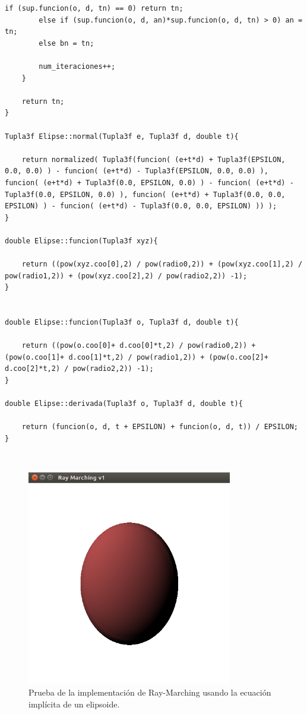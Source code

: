 \begin{lstlisting}[style=Consola]
		if (sup.funcion(o, d, tn) == 0) return tn;
		else if (sup.funcion(o, d, an)*sup.funcion(o, d, tn) > 0) an = tn;
		else bn = tn;
		
		num_iteraciones++;
	}

	return tn;
}

Tupla3f Elipse::normal(Tupla3f e, Tupla3f d, double t){

	return normalized( Tupla3f(funcion( (e+t*d) + Tupla3f(EPSILON, 0.0, 0.0) ) - funcion( (e+t*d) - Tupla3f(EPSILON, 0.0, 0.0) ), funcion( (e+t*d) + Tupla3f(0.0, EPSILON, 0.0) ) - funcion( (e+t*d) - Tupla3f(0.0, EPSILON, 0.0) ), funcion( (e+t*d) + Tupla3f(0.0, 0.0, EPSILON) ) - funcion( (e+t*d) - Tupla3f(0.0, 0.0, EPSILON) )) );
}

double Elipse::funcion(Tupla3f xyz){

	return ((pow(xyz.coo[0],2) / pow(radio0,2)) + (pow(xyz.coo[1],2) / pow(radio1,2)) + (pow(xyz.coo[2],2) / pow(radio2,2)) -1);
}


double Elipse::funcion(Tupla3f o, Tupla3f d, double t){

	return ((pow(o.coo[0]+ d.coo[0]*t,2) / pow(radio0,2)) + (pow(o.coo[1]+ d.coo[1]*t,2) / pow(radio1,2)) + (pow(o.coo[2]+ d.coo[2]*t,2) / pow(radio2,2)) -1);
}

double Elipse::derivada(Tupla3f o, Tupla3f d, double t){

	return (funcion(o, d, t + EPSILON) + funcion(o, d, t)) / EPSILON;
}
\end{lstlisting}
${ }$\\



\begin{figure}
	\begin{center}
		\includegraphics[width=0.8\textwidth]{imagenes/Prueba2.png}
	\end{center}
	\caption{Prueba de la implementación de Ray-Marching usando la ecuación implícita de un elipsoide.}
	\label{fig:etiq_10}
\end{figure}









